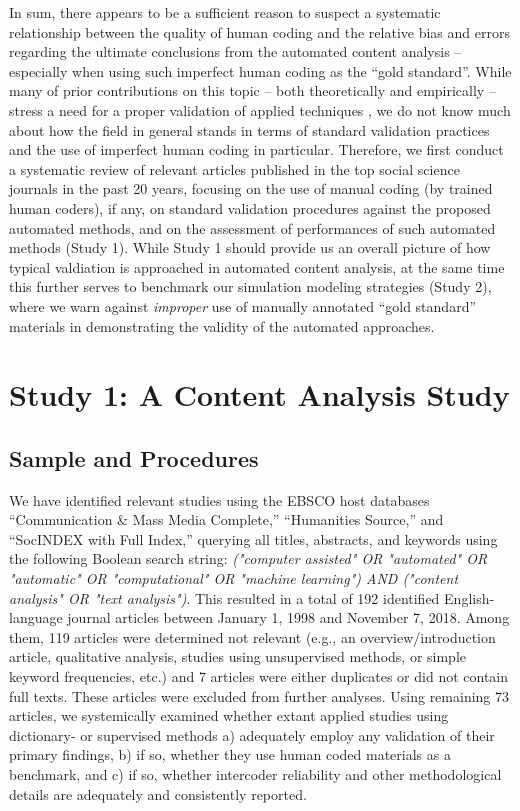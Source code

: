 \documentclass[man, 12pt, a4paper, nolmodern, noextraspace]{apa6}
\begin{document}
    In sum, there appears to be a sufficient reason to suspect a systematic relationship between the quality of human coding and the relative bias and errors regarding the ultimate conclusions from the automated content analysis -- especially when using such imperfect human coding as the ``gold standard''. While many of prior contributions on this topic -- both theoretically and empirically -- stress a need for a proper validation of applied techniques \parencites[e.g.,][]{grimmer2013text, Hopkins_King2010, gonzalez2015signals}, we do not know much about how the field in general stands in terms of standard validation practices and the use of imperfect human coding in particular. Therefore, we first conduct a systematic review of relevant articles published in the top social science journals in the past 20 years, focusing on the use of manual coding (by trained human coders), if any, on standard validation procedures against the proposed automated methods, and on the assessment of performances of such automated methods (Study 1). While Study 1 should provide us an overall picture of how typical valdiation is approached in automated content analysis, at the same time this further serves to benchmark our simulation modeling strategies (Study 2), where we warn against \textit{improper} use of manually annotated \enquote{gold standard} materials in demonstrating the validity of the automated approaches.

\section{Study 1: A Content Analysis Study}

\subsection{Sample and Procedures}

    We have identified relevant studies using the EBSCO host databases “Communication \& Mass Media Complete,” “Humanities Source,” and “SocINDEX with Full Index,” querying all titles, abstracts, and keywords using the following Boolean search string: \textit{("computer assisted" OR "automated" OR "automatic" OR "computational" OR "machine learning") AND ("content analysis" OR "text analysis")}. This resulted in a total of 192 identified English-language journal articles between January 1, 1998 and November 7, 2018. Among them, 119 articles were determined not relevant (e.g., an overview/introduction article, qualitative analysis, studies using unsupervised methods, or simple keyword frequencies, etc.) and 7 articles were either duplicates or did not contain full texts. These articles were excluded from further analyses. Using remaining 73 articles, we systemically examined whether extant applied studies using dictionary- or supervised methods a) adequately employ any validation of their primary findings, b) if so, whether they use human coded materials as a benchmark, and c) if so, whether intercoder reliability and other methodological details are adequately and consistently reported. 
    
\end{document}
